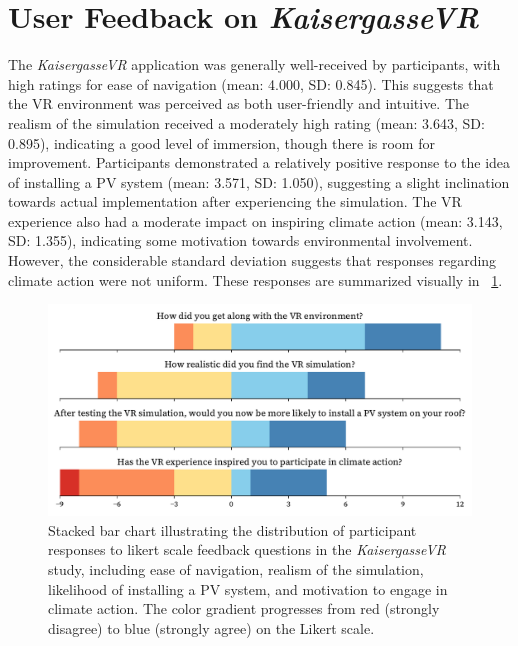 \documentclass[draft, final]{vutinfth} %
\begin{document}
\section{User Feedback on \textit{KaisergasseVR}} \label{sec:kaisergasse-feedback}

The \textit{KaisergasseVR} application was generally well-received by participants, with high ratings for ease of navigation (mean: 4.000, SD: 0.845). This suggests that the VR environment was perceived as both user-friendly and intuitive. The realism of the simulation received a moderately high rating (mean: 3.643, SD: 0.895), indicating a good level of immersion, though there is room for improvement. Participants demonstrated a relatively positive response to the idea of installing a PV system (mean: 3.571, SD: 1.050), suggesting a slight inclination towards actual implementation after experiencing the simulation.  The VR experience also had a moderate impact on inspiring climate action (mean: 3.143, SD: 1.355), indicating some motivation towards environmental involvement. However, the considerable standard deviation suggests that responses regarding climate action were not uniform.
These responses are summarized visually in \figurename~\ref{fig:feedback-kaisergasse}.

\begin{figure}[h]
    \centering
    \includegraphics[width=\textwidth]{graphics/feedback-kaisergasse.pdf}
    \caption{Stacked bar chart illustrating the distribution of participant responses to likert scale feedback questions in the \textit{KaisergasseVR} study, including ease of navigation, realism of the simulation, likelihood of installing a PV system, and motivation to engage in climate action. The color gradient progresses from red (strongly disagree) to blue (strongly agree) on the Likert scale.}
    \label{fig:feedback-kaisergasse}
\end{figure}
\end{document}
